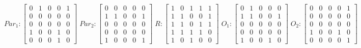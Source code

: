      $$
        Par_{1} : \begin{bmatrix}
            0 & 1 & 0 & 0 & 1 \\
            0 & 0 & 0 & 0 & 0 \\
            0 & 0 & 0 & 0 & 0 \\
			1 & 0 & 0 & 1 & 0 \\
            0 & 0 & 0 & 1 & 0 
        \end{bmatrix}
        \;
        Par_{2} : \begin{bmatrix}
            0 & 0 & 0 & 0 & 0 \\
            1 & 1 & 0 & 0 & 1 \\
            0 & 0 & 0 & 0 & 0 \\
            0 & 0 & 0 & 0 & 0 \\
            1 & 0 & 0 & 0 & 1
        \end{bmatrix}
        \;
        R : \begin{bmatrix}
            1 & 0 & 1 & 1 & 1 \\
            1 & 1 & 0 & 0 & 1 \\
            1 & 1 & 0 & 1 & 1 \\
            1 & 1 & 1 & 1 & 0 \\
            1 & 0 & 1 & 0 & 0
        \end{bmatrix}
        \;
        O_{1} : \begin{bmatrix}
            0 & 1 & 0 & 0 & 0 \\
            1 & 1 & 0 & 0 & 1 \\
            0 & 0 & 0 & 0 & 0 \\
            0 & 0 & 0 & 0 & 0 \\
            1 & 0 & 0 & 1 & 0
        \end{bmatrix}
        \;
        O_{2} : \begin{bmatrix}
            0 & 0 & 0 & 0 & 1 \\
            0 & 0 & 0 & 0 & 0 \\
            0 & 0 & 0 & 0 & 0 \\
            1 & 0 & 0 & 1 & 0 \\
            0 & 0 & 0 & 0 & 1
        \end{bmatrix}
    $$ 
